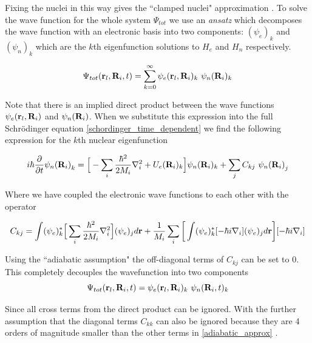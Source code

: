 Fixing the nuclei in this way gives the ``clamped nuclei" approximation \cite{sherrill}. To solve the wave function for the whole system $\Psi_{tot}$ we use an \textit{ansatz} which decomposes the wave function with an electronic basis into two components: $({\psi_e})_k$ and $({\psi_n})_k$ which are the $k$th eigenfunction solutions to $H_e$ and $H_n$ respectively.

\begin{equation}
	\Psi_{tot} (\bold{r}_l,\bold{R}_i, t) = \sum_{k=0}^\infty {\psi_e}(\bold{r}_l, \bold{R}_i)_k\ {\psi_n}(\bold{R}_i)_k
\end{equation}

Note that there is an implied direct product between the wave functions $\psi_e(\bold{r}_l, \bold{R}_i)$ and $\psi_n(\bold{R}_i)$. When we substitute this expression into the full Schr\"odinger equation \ref{schordinger_time_dependent} we find the following expression for the $k$th nuclear eigenfunction \cite{miller1976} 

\begin{equation}
	i \hbar \frac{\partial} {\partial t} {\psi_n(\bold{R}_i)}_k = \Big[- \sum_i \frac{\hbar^2}{2M_i} \nabla^2_i  + {U_e} (\bold{R}_i)_k\Big] \psi_n (\bold{R}_i)_k + \sum_j C_{kj} \ {\psi_n(\bold{R}_i)}_j 
	\label{adiabatic_approx}
\end{equation}

Where we have coupled the electronic wave functions to each other with the operator 

\begin{equation}
	C_{kj} = \int ({\psi_e})_k ^* \Big[\sum_i\frac{\hbar^2}{2M_i}\nabla^2_i\Big] ({\psi_e})_j d\bold{r}  + \frac{1}{M_i}\sum_{i}\bigg[ \int({\psi_e})_k ^* [-\hbar i \nabla_i]({\psi_e})_jd\bold{r}\bigg] [-\hbar i \nabla_i]
\end{equation}

Using the ``adiabatic assumption" \cite{miller1976} the off-diagonal terms of $C_{kj}$ can be set to $0$. This completely decouples the wavefunction into two components 
\begin{equation}
	\Psi_{tot} (\bold{r}_l,\bold{R}_i, t) = {\psi_e}(\bold{r}_l, \bold{R}_i)_k\ {\psi_n}(\bold{R}_i,t)_k
\end{equation}

Since all cross terms from the direct product can be ignored. With the further assumption that the diagonal terms $C_{kk}$ can also be ignored because they are 4 orders of magnitude smaller than the other terms in \ref{adiabatic_approx} \cite{sherrill}.

